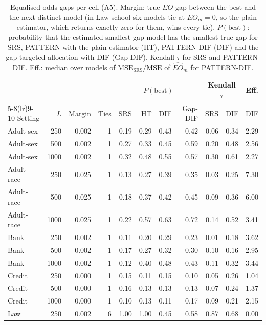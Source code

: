 \documentclass[pdflatex,sn-mathphys-num,iicol]{sn-jnl}
\theoremstyle{thmstyleone}
\theoremstyle{thmstyletwo}
\theoremstyle{thmstylethree}
\begin{document}
\begin{table}[t]
\centering\scriptsize
\caption{Equalised-odds gaps per cell (A5). Margin: true $EO$ gap between the best and the next distinct model (in Law school six models tie at $EO_m=0$, so the plain estimator, which returns exactly zero for them, wins every tie). $P(\mathrm{best})$: probability that the estimated smallest-gap model has the smallest true gap for SRS, PATTERN with the plain estimator (HT), PATTERN-DIF (DIF) and the gap-targeted allocation with DIF (Gap-DIF). Kendall $\tau$ for SRS and PATTERN-DIF. Eff.: median over models of $\mathrm{MSE}_{\mathrm{SRS}}/\mathrm{MSE}$ of $\widehat{EO}_m$ for PATTERN-DIF.}
\label{tab:abl-app-eo}
\setlength{\tabcolsep}{4pt}
\begin{tabular}{lrrrrrrrrrr}
\toprule
 & & & & \multicolumn{4}{c}{$P(\mathrm{best})$} & \multicolumn{2}{c}{Kendall $\tau$} & Eff. \\
\cmidrule(lr){5-8}\cmidrule(lr){9-10}
Setting & $L$ & Margin & Ties & SRS & HT & DIF & Gap-DIF & SRS & DIF & DIF \\
\midrule
Adult-sex & 250 & 0.002 & 1 & 0.19 & 0.29 & 0.43 & 0.42 & 0.06 & 0.34 & 2.29 \\
Adult-sex & 500 & 0.002 & 1 & 0.27 & 0.33 & 0.45 & 0.59 & 0.20 & 0.48 & 2.56 \\
Adult-sex & 1000 & 0.002 & 1 & 0.32 & 0.48 & 0.55 & 0.57 & 0.30 & 0.61 & 2.27 \\
Adult-race & 250 & 0.025 & 1 & 0.13 & 0.27 & 0.39 & 0.35 & 0.03 & 0.25 & 7.30 \\
Adult-race & 500 & 0.025 & 1 & 0.18 & 0.37 & 0.42 & 0.45 & 0.09 & 0.36 & 6.00 \\
Adult-race & 1000 & 0.025 & 1 & 0.22 & 0.57 & 0.63 & 0.72 & 0.14 & 0.52 & 3.41 \\
Bank & 250 & 0.002 & 1 & 0.11 & 0.20 & 0.29 & 0.23 & 0.01 & 0.18 & 3.62 \\
Bank & 500 & 0.002 & 1 & 0.17 & 0.27 & 0.32 & 0.30 & 0.10 & 0.16 & 2.95 \\
Bank & 1000 & 0.002 & 1 & 0.12 & 0.40 & 0.48 & 0.43 & 0.11 & 0.32 & 3.44 \\
Credit & 250 & 0.000 & 1 & 0.15 & 0.11 & 0.15 & 0.10 & 0.05 & 0.26 & 1.04 \\
Credit & 500 & 0.000 & 1 & 0.16 & 0.13 & 0.13 & 0.13 & 0.07 & 0.24 & 1.37 \\
Credit & 1000 & 0.000 & 1 & 0.10 & 0.13 & 0.11 & 0.17 & 0.09 & 0.21 & 2.15 \\
Law & 250 & 0.002 & 6 & 1.00 & 1.00 & 0.45 & 0.58 & 0.87 & 0.68 & 0.00 \\

\end{tabular}
\end{table}
\end{document}
